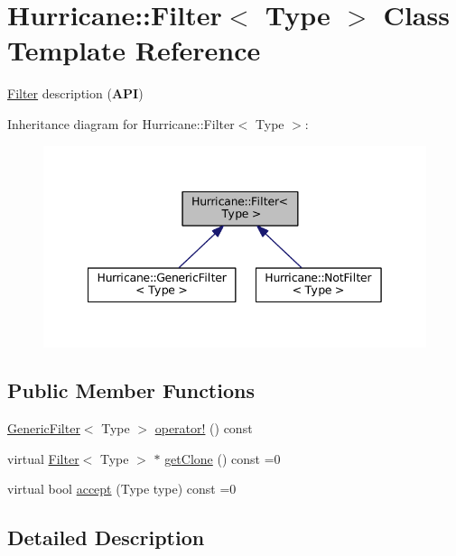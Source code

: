 \hypertarget{classHurricane_1_1Filter}{}\section{Hurricane\+:\+:Filter$<$ Type $>$ Class Template Reference}
\label{classHurricane_1_1Filter}


\mbox{\hyperlink{classHurricane_1_1Filter}{Filter}} description ({\bfseries A\+PI})  




Inheritance diagram for Hurricane\+:\+:Filter$<$ Type $>$\+:\nopagebreak
\begin{figure}[H]
\begin{center}
\leavevmode
\includegraphics[width=342pt]{classHurricane_1_1Filter__inherit__graph}
\end{center}
\end{figure}
\subsection*{Public Member Functions}
\begin{DoxyCompactItemize}
\item 
\mbox{\hyperlink{classHurricane_1_1GenericFilter}{Generic\+Filter}}$<$ Type $>$ \mbox{\hyperlink{classHurricane_1_1Filter_a90c1a8c4caf6c6018ff50f5b9754e061}{operator!}} () const
\item 
virtual \mbox{\hyperlink{classHurricane_1_1Filter}{Filter}}$<$ Type $>$ $\ast$ \mbox{\hyperlink{classHurricane_1_1Filter_a596cad421801115efbc5c541f8d29e0b}{get\+Clone}} () const =0
\item 
virtual bool \mbox{\hyperlink{classHurricane_1_1Filter_aeaa771f17950fe05273c471ccfffb7f7}{accept}} (Type type) const =0
\end{DoxyCompactItemize}


\subsection{Detailed Description}
